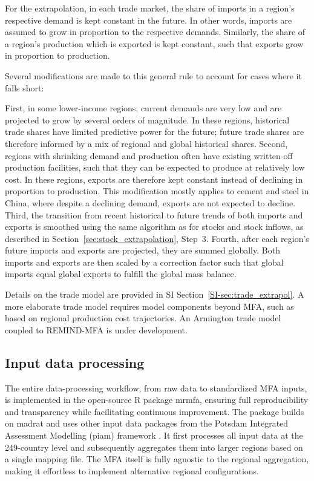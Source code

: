 \documentclass[pdflatex]{sn-jnl}
\begin{document}
For the extrapolation, in each trade market, the share of imports in a region’s respective demand is kept constant in the future. In other words, imports are assumed to grow in proportion to the respective demands. Similarly, the share of a region’s production which is exported is kept constant, such that exports grow in proportion to production.

Several modifications are made to this general rule to account for cases where it falls short:

First, in some lower-income regions, current demands are very low and are projected to grow by several orders of magnitude. In these regions, historical trade shares have limited predictive power for the future; future trade shares are therefore informed by a mix of regional and global historical shares. Second, regions with shrinking demand and production often have existing written-off production facilities, such that they can be expected to produce at relatively low cost. In these regions, exports are therefore kept constant instead of declining in proportion to production. This modification mostly applies to cement and steel in China, where despite a declining demand, exports are not expected to decline. Third, the transition from recent historical to future trends of both imports and exports is smoothed using the same algorithm as for stocks and stock inflows, as described in Section~\ref{sec:stock_extrapolation}, Step~3. Fourth, after each region’s future imports and exports are projected, they are summed globally. Both imports and exports are then scaled by a correction factor such that global imports equal global exports to fulfill the global mass balance.

Details on the trade model are provided in SI Section~\ref{SI-sec:trade_extrapol}. A more elaborate trade model requires model components beyond MFA, such as based on regional production cost trajectories. An Armington trade model coupled to REMIND-MFA is under development.

\subsection{Input data processing}\label{sec:input_data}
The entire data-processing workflow, from raw data to standardized MFA inputs, is implemented in the open-source R package mrmfa, ensuring full reproducibility and transparency while facilitating continuous improvement. The package builds on madrat \parencite{dietrichMadratMayAll2024} and uses other input data packages from the Potsdam Integrated Assessment Modelling (piam) framework \parencite{baumstark2020,koch2026}. It first processes all input data at the 249-country level and subsequently aggregates them into larger regions based on a single mapping file. The MFA itself is fully agnostic to the regional aggregation, making it effortless to implement alternative regional configurations.
\end{document}
